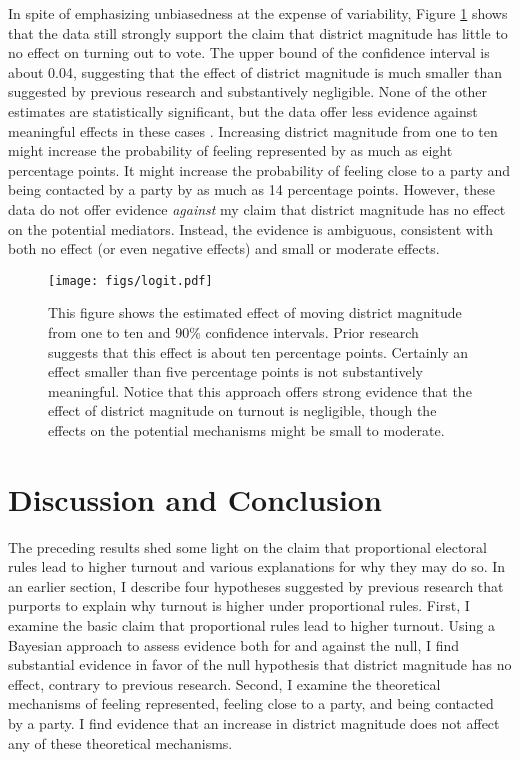 \documentclass[12pt]{article}
\begin{document}
In spite of emphasizing unbiasedness at the expense of variability, Figure \ref{fig:logit} shows that the data still strongly support the claim that district magnitude has little to no effect on turning out to vote. The upper bound of the confidence interval is about 0.04, suggesting that the effect of district magnitude is much smaller than suggested by previous research and substantively negligible. None of the other estimates are statistically significant, but the data offer less evidence against meaningful effects in these cases \citep{Rainey2014}. Increasing district magnitude from one to ten might increase the probability of feeling represented by as much as eight percentage points. It might increase the probability of feeling close to a party and being contacted by a party by as much as 14 percentage points. However, these data do not offer evidence \textit{against} my claim that district magnitude has no effect on the potential mediators. Instead, the evidence is ambiguous, consistent with both no effect (or even negative effects) and small or moderate effects.  

\begin{figure}[h]
\begin{center}
\texttt{[image: figs/logit.pdf]}
\caption{This figure shows the estimated effect of moving district magnitude from one to ten and 90\% confidence intervals. Prior research suggests that this effect is about ten percentage points. Certainly an effect smaller than five percentage points is not substantively meaningful. Notice that this approach offers strong evidence that the effect of district magnitude on turnout is negligible, though the effects on the potential mechanisms might be small to moderate.}\label{fig:logit}
\end{center}
\end{figure}

\section*{Discussion and Conclusion}

The preceding results shed some light on the claim that proportional electoral rules lead to higher turnout and various explanations for why they may do so. In an earlier section, I describe four hypotheses suggested by previous research that purports to explain why turnout is higher under proportional rules. First, I examine the basic claim that proportional rules lead to higher turnout. Using a Bayesian approach to assess evidence both for and against the null, I find substantial evidence in favor of the null hypothesis that district magnitude has no effect, contrary to previous research. Second, I examine the theoretical mechanisms of feeling represented, feeling close to a party, and being contacted by a party. I find evidence that an increase in district magnitude does not affect any of these theoretical mechanisms. 
\end{document}
